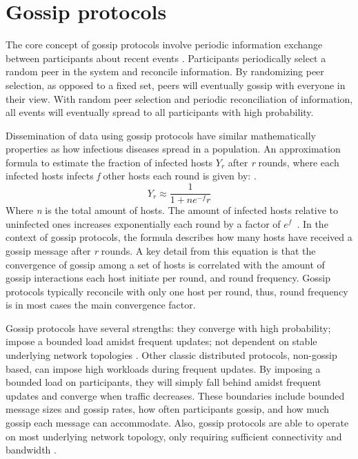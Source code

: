 \documentclass[USenglish]{uit-thesis}
\begin{document}
\section{Gossip protocols}
The core concept of gossip protocols involve periodic information exchange between participants about recent events \cite{epidemic}.
Participants periodically select a random peer in the system and reconcile information.
By randomizing peer selection, as opposed to a fixed set, peers will eventually gossip with everyone in their view.
With random peer selection and periodic reconciliation of information, all events will eventually spread to all participants with high probability.

Dissemination of data using gossip protocols have similar mathematically properties as how infectious diseases spread in a population. 
An approximation formula to estimate the fraction of infected hosts $Y_r$ after \textit{r} rounds, where each infected hosts infects \textit{f} other hosts each round is given by: \cite{epidemic, infect_math}.
\begin{equation}
Y_r \approx \frac{1}{1 + n e^{-f} r}
\end{equation}
Where \textit{n} is the total amount of hosts.
The amount of infected hosts relative to uninfected ones increases exponentially each round by a factor of $e^f$~\cite{epidemic}.
In the context of gossip protocols, the formula describes how many hosts have received a gossip message after \textit{r} rounds.
A key detail from this equation is that the convergence of gossip among a set of hosts is correlated with the amount of gossip interactions each host initiate per round, and round frequency.
Gossip protocols typically reconcile with only one host per round, thus, round frequency is in most cases the main convergence factor.  


Gossip protocols have several strengths: they converge with high probability; impose a bounded load amidst frequent updates; not dependent on stable underlying network topologies \cite{gossip_promise}.
Other classic distributed protocols, non-gossip based, can impose high workloads during frequent updates.
By imposing a bounded load on participants, they will simply fall behind amidst frequent updates and converge when traffic decreases.
These boundaries include bounded message sizes and gossip rates, how often participants gossip, and how much gossip each message can accommodate. 
Also, gossip protocols are able to operate on most underlying network topology, only requiring sufficient connectivity and bandwidth \cite{gossip_promise}.
 
\end{document}
